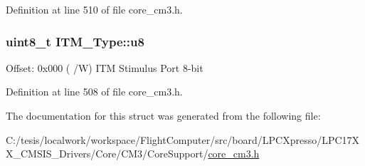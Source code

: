 \-Definition at line 510 of file core\-\_\-cm3.\-h.

\hypertarget{struct_i_t_m___type_abea77b06775d325e5f6f46203f582433}{
\subsubsection[{u8}]{ uint8\-\_\-t {\bf \-I\-T\-M\-\_\-\-Type\-::u8}}}\label{struct_i_t_m___type_abea77b06775d325e5f6f46203f582433}
\-Offset\-: 0x000 ( /\-W) \-I\-T\-M \-Stimulus \-Port 8-\/bit 

\-Definition at line 508 of file core\-\_\-cm3.\-h.



\-The documentation for this struct was generated from the following file\-:\begin{DoxyCompactItemize}
\item 
\-C\-:/tesis/localwork/workspace/\-Flight\-Computer/src/board/\-L\-P\-C\-Xpresso/\-L\-P\-C17\-X\-X\-\_\-\-C\-M\-S\-I\-S\-\_\-\-Drivers/\-Core/\-C\-M3/\-Core\-Support/\hyperlink{core__cm3_8h}{core\-\_\-cm3.\-h}\end{DoxyCompactItemize}
